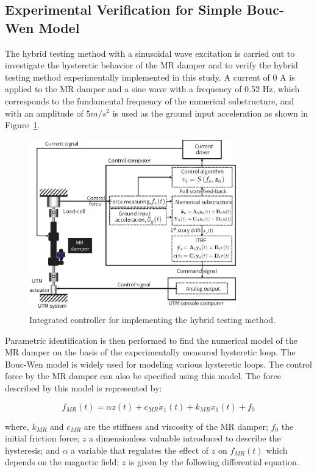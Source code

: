 \subsection{Experimental Verification for Simple Bouc-Wen Model}

The hybrid testing method with a sinusoidal wave excitation is carried out to investigate the hysteretic behavior of the MR damper and to verify the hybrid testing method experimentally implemented in this study. A current of 0 A is applied to the MR damper and a sine wave with a frequency of 0.52 Hz, which corresponds to the fundamental frequency of the numerical substructure, and with an amplitude of $5m/s^{2}$ is used as the ground input acceleration as shown in Figure~\ref{fig:8-7}.

\begin{figure}[H]
\centering
\includegraphics[width=0.8\textwidth] {figure/8-7.eps}
\caption{Integrated controller for implementing the hybrid testing method.}
\label{fig:8-7}
\end{figure}

Parametric identification is then performed to find the numerical model of the MR damper on the basis of the experimentally measured hysteretic loop. The Bouc-Wen model is widely used for modeling various hysteretic loops\citep{wen1976method}. The control force by the MR damper can also be specified using this model. The force described by this model is represented by:

\begin{equation}\label{eq:8-13}
f_{MR}(t) = \alpha z(t) + c_{MR}\dot{x}_{1}(t) + k_{MR}x_{1}(t) + f_{0}
\end{equation}

where, $k_{MR}$ and $c_{MR}$ are the stiffness and viscosity of the MR damper; $f_{0}$ the initial friction force; $z$ a dimensionless valuable introduced to describe the hysteresis; and $\alpha$ a variable that regulates the effect of $z$ on $f_{MR}(t)$ which depends on the magnetic field; $z$ is given by the following differential equation.

